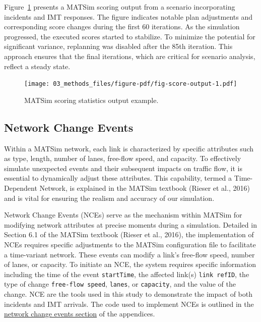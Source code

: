 \documentclass[fancy, oneside, mastersfancy, ms]{byuthesis}
\begin{document}
Figure~\ref{fig-score-output} presents a MATSim scoring output from a
scenario incorporating incidents and IMT responses. The figure indicates
notable plan adjustments and corresponding score changes during the
first 60 iterations. As the simulation progressed, the executed scores
started to stabilize. To minimize the potential for significant
variance, replanning was disabled after the 85th iteration. This
approach ensures that the final iterations, which are critical for
scenario analysis, reflect a steady state.

\begin{figure}

{\centering \texttt{[image: 03\_methods\_files/figure-pdf/fig-score-output-1.pdf]}

}

\caption{\label{fig-score-output}MATSim scoring statistics output
example.}

\end{figure}

\hypertarget{sec-NCE}{%
\subsection{Network Change Events}\label{sec-NCE}}

Within a MATSim network, each link is characterized by specific
attributes such as type, length, number of lanes, free-flow speed, and
capacity. To effectively simulate unexpected events and their subsequent
impacts on traffic flow, it is essential to dynamically adjust these
attributes. This capability, termed a Time-Dependent Network, is
explained in the MATSim textbook (Rieser et al., 2016) and is vital for
ensuring the realism and accuracy of our simulation.

Network Change Events (NCEs) serve as the mechanism within MATSim for
modifying network attributes at precise moments during a simulation.
Detailed in Section 6.1 of the MATSim textbook (Rieser et al., 2016),
the implementation of NCEs requires specific adjustments to the MATSim
configuration file to facilitate a time-variant network. These events
can modify a link's free-flow speed, number of lanes, or capacity. To
initiate an NCE, the system requires specific information including the
time of the event \texttt{startTime}, the affected link(s)
\texttt{link\ refID}, the type of change \texttt{free-flow\ speed},
\texttt{lanes}, or \texttt{capacity}, and the value of the change. NCE
are the tools used in this study to demonstrate the impact of both
incidents and IMT arrivals. The code used to implement NCEs is outlined
in the \protect\hyperlink{sec-apend_nce}{network change events section}
of the appendices.
\end{document}
